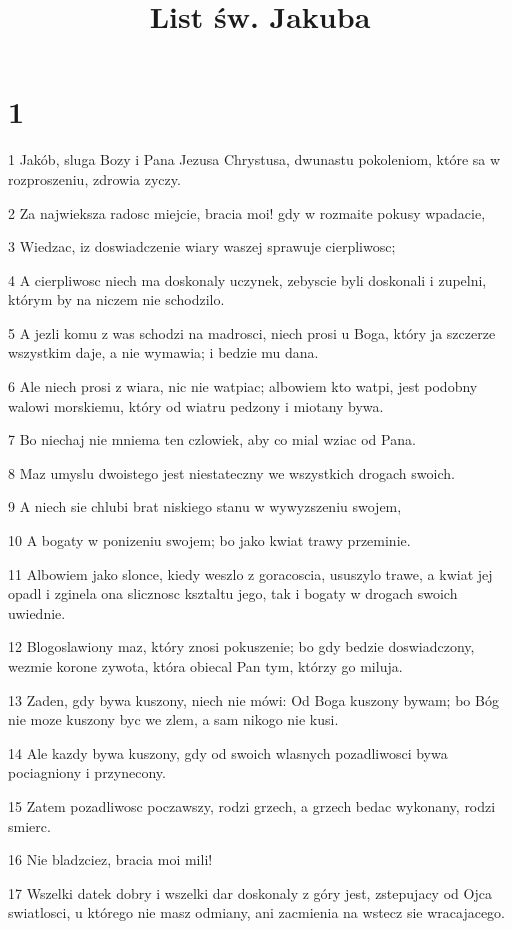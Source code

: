 

\title{List św. Jakuba}


\chapter{1}

\par 1 Jakób, sluga Bozy i Pana Jezusa Chrystusa, dwunastu pokoleniom, które sa w rozproszeniu, zdrowia zyczy.
\par 2 Za najwieksza radosc miejcie, bracia moi! gdy w rozmaite pokusy wpadacie,
\par 3 Wiedzac, iz doswiadczenie wiary waszej sprawuje cierpliwosc;
\par 4 A cierpliwosc niech ma doskonaly uczynek, zebyscie byli doskonali i zupelni, którym by na niczem nie schodzilo.
\par 5 A jezli komu z was schodzi na madrosci, niech prosi u Boga, który ja szczerze wszystkim daje, a nie wymawia; i bedzie mu dana.
\par 6 Ale niech prosi z wiara, nic nie watpiac; albowiem kto watpi, jest podobny walowi morskiemu, który od wiatru pedzony i miotany bywa.
\par 7 Bo niechaj nie mniema ten czlowiek, aby co mial wziac od Pana.
\par 8 Maz umyslu dwoistego jest niestateczny we wszystkich drogach swoich.
\par 9 A niech sie chlubi brat niskiego stanu w wywyzszeniu swojem,
\par 10 A bogaty w ponizeniu swojem; bo jako kwiat trawy przeminie.
\par 11 Albowiem jako slonce, kiedy weszlo z goracoscia, ususzylo trawe, a kwiat jej opadl i zginela ona slicznosc ksztaltu jego, tak i bogaty w drogach swoich uwiednie.
\par 12 Blogoslawiony maz, który znosi pokuszenie; bo gdy bedzie doswiadczony, wezmie korone zywota, która obiecal Pan tym, którzy go miluja.
\par 13 Zaden, gdy bywa kuszony, niech nie mówi: Od Boga kuszony bywam; bo Bóg nie moze kuszony byc we zlem, a sam nikogo nie kusi.
\par 14 Ale kazdy bywa kuszony, gdy od swoich wlasnych pozadliwosci bywa pociagniony i przynecony.
\par 15 Zatem pozadliwosc poczawszy, rodzi grzech, a grzech bedac wykonany, rodzi smierc.
\par 16 Nie bladzciez, bracia moi mili!
\par 17 Wszelki datek dobry i wszelki dar doskonaly z góry jest, zstepujacy od Ojca swiatlosci, u którego nie masz odmiany, ani zacmienia na wstecz sie wracajacego.
